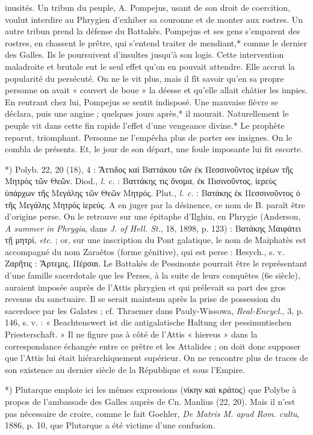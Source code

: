 \documentclass[a4paper, 11pt, oneside, polutonikogreek, french]{article}
\begin{document}
inusités. Un tribun du peuple, A. Pompejus, usant de son droit de coercition, voulut interdire au Phrygien d'exhiber sa couronne et de monter aux rostres. Un autre tribun prend la défense du Battakès. Pompejus et ses gens s'emparent des rostres, en chassent le prêtre, qui s'entend traiter de mendiant,* comme le dernier des Galles. Ils le poursuivent d'insultes jusqu'à son logis. Cette intervention maladroite et brutale eut le seul effet qu'on en pouvait attendre. Elle accrut la popularité du persécuté. On ne le vit plus, mais il fît savoir qu'en sa propre personne on avait « couvert de boue » la déesse et qu'elle allait châtier les impies. En rentrant chez lui, Pompejus se sentit indisposé. Une mauvaise fièvre se déclara, puis une angine ; quelques jours après,* il mourait. Naturellement le peuple vit dans cette fin rapide l'effet d'une vengeance divine.* Le prophète reparut, triomphant. Personne ne l'empêcha plus de porter ses insignes. On le combla de présents. Et, le jour de son départ, une foule imposante lui fit escorte.

*) Polyb. 22, 20 (18), 4 : Ἄττιδος καὶ Βαττάκου τῶν ἐκ Πεσσινοῦντος ἱερέων τῆς Mητρὸς τῶν Θεῶν. Diod., \emph{l. c.} : Βαττάκης τις ὄνομα, ἐκ Πισινοῦντος, ἱερεὺς ὑπάρχων τῆς Μεγάλης τῶν Θεῶν Μητρός. Plut., \emph{l. c.} : Βατάκης ἐκ Πεσσινοῦντος ὁ τῆς Μεγάλης Μητρὸς ἱερεύς. A en juger par la désinence, ce nom de B. paraît être d'origine perse. On le retrouve sur une épitaphe d'Ilghin, en Phrygie (Anderson, \emph{A summer in Phrygia}, dans \emph{J. of Hell. St.}, 18, 1898, p. 123) : Βατάκης Mαιφάτει τῇ μητρί, \emph{etc.} ; or, sur une inscription du Pont galatique, le nom de Maiphatès est accompagné du nom Zaraêtos (forme génitive), qui est perse : Hesych., s. v. Ζαρῆτις : Ἄρτεμις, Πέρσαι. Le Battakès de Pessinonte pourrait être le représentant d'une famille sacerdotale que les Perses, à la suite de leurs conquêtes (6e siècle), auraient imposée auprès de l'Attis phrygien et qui prélevait sa part des gros revenus du sanctuaire. Il se serait maintenu après la prise de possession du sacerdoce par les Galates ; cf. Thraemer dans Pauly-Wissowa, \emph{Real-Encycl.}, 3, p. 146, s. v. : « Beachtenswert ist die antigalatische Haltung der pessinuntischen Priesterschaft. » Il ne figure pas à côté de l'Attis « hiereus » dans la correspondance échangée entre ce prêtre et les Attalides ; on doit donc supposer que l'Attis lui était hiérarchiquement supérieur. On ne rencontre plus de traces de son existence au dernier siècle de la République et sous l'Empire.

*) Plutarque emploie ici les mêmes expressions (νίκην καὶ κράτος) que Polybe à propos de l'ambassade des Galles auprès de Cn. Manlius (22, 20). Mais il n'est pas nécessaire de croire, comme le fait Goehler, \emph{De Matris M. apud Rom. cultu}, 1886, p. 10, que Plutarque a été victime d'une confusion.
\end{document}
